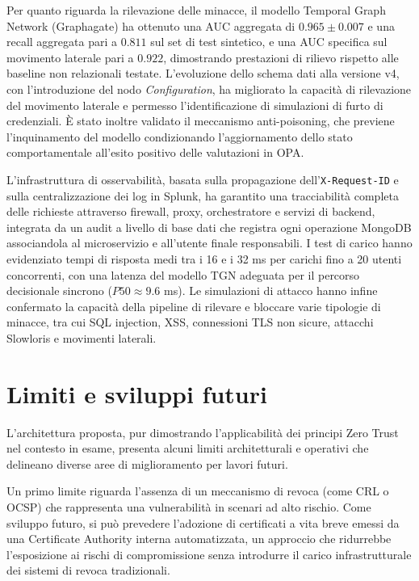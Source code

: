 Per quanto riguarda la rilevazione delle minacce, il modello Temporal Graph Network (Graphagate) ha ottenuto una AUC aggregata di $0.965 \pm 0.007$ e una recall aggregata pari a $0.811$ sul set di test sintetico, e una AUC specifica sul movimento laterale pari a $0.922$, dimostrando prestazioni di rilievo rispetto alle baseline non relazionali testate. L'evoluzione dello schema dati alla versione v4, con l'introduzione del nodo \textit{Configuration}, ha migliorato la capacità di rilevazione del movimento laterale e permesso l'identificazione di simulazioni di furto di credenziali. È stato inoltre validato il meccanismo anti-poisoning, che previene l'inquinamento del modello condizionando l'aggiornamento dello stato comportamentale all'esito positivo delle valutazioni in OPA.

L'infrastruttura di osservabilità, basata sulla propagazione dell'\texttt{X-Request-ID} e sulla centralizzazione dei log in Splunk, ha garantito una tracciabilità completa delle richieste attraverso  firewall, proxy, orchestratore e servizi di backend, integrata da un audit a livello di base dati che registra ogni operazione MongoDB associandola al microservizio e all'utente finale responsabili. I test di carico hanno evidenziato tempi di risposta medi tra i 16 e i 32 ms per carichi fino a 20 utenti concorrenti, con una latenza del modello TGN adeguata per il percorso decisionale sincrono ($P50 \approx 9.6$ ms). Le simulazioni di attacco hanno infine confermato la capacità della pipeline di rilevare e bloccare varie tipologie di minacce, tra cui SQL injection, XSS, connessioni TLS non sicure, attacchi Slowloris e movimenti laterali.

\section{Limiti e sviluppi futuri}

L'architettura proposta, pur dimostrando l'applicabilità dei principi Zero Trust nel contesto in esame, presenta alcuni limiti architetturali e operativi che delineano diverse aree di miglioramento per lavori futuri.

Un primo limite riguarda  l'assenza di un meccanismo di revoca (come CRL o OCSP) che rappresenta una vulnerabilità in scenari ad alto rischio. Come sviluppo futuro, si può prevedere l'adozione di certificati a vita breve emessi da una Certificate Authority interna automatizzata, un approccio che ridurrebbe l'esposizione ai rischi di compromissione senza introdurre il carico infrastrutturale dei sistemi di revoca tradizionali.

